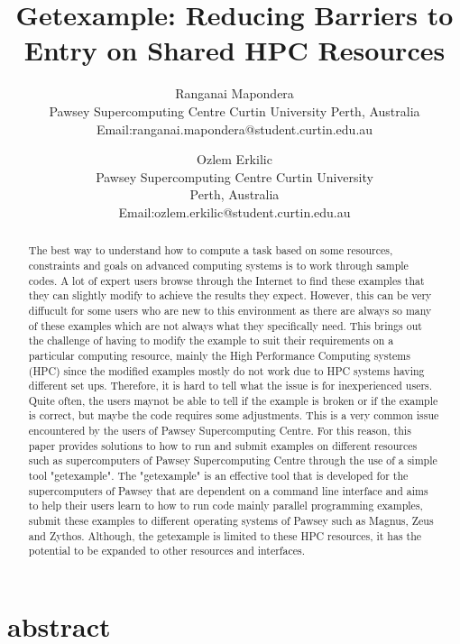 \documentclass[journal]{IEEEtran}
\begin{document}
\title{Getexample: Reducing Barriers to Entry on Shared HPC Resources}
\author{Ranganai Mapondera\\Pawsey Supercomputing Centre Curtin University Perth, Australia\\Email:ranganai.mapondera@student.curtin.edu.au}
\author{Ozlem Erkilic\\Pawsey Supercomputing Centre Curtin University\\Perth, Australia\\Email:ozlem.erkilic@student.curtin.edu.au}
\maketitle

\section{abstract}
\begin{abstract}

The best way to understand how to compute a task based on some resources, constraints and goals on advanced computing systems is to work through sample 
codes. A lot of expert users browse through the Internet to find these examples that they can slightly modify to achieve the results they expect. 
However, this can be very diffucult for some users who are new to this environment as there are always so many of these examples which are not 
always what they specifically need. This brings out the challenge of having to modify the example to suit their requirements on a particular computing 
resource, mainly the High Performance Computing systems (HPC) since the modified examples mostly do not work due to HPC systems having different set ups.
Therefore, it is hard to tell what the issue is for inexperienced users. Quite often, the users maynot be able to tell if the example is broken or if 
the example is correct, but maybe the code requires some adjustments. This is a very common issue encountered by the users of Pawsey Supercomputing 
Centre. For this reason, this paper provides solutions to how to run and submit examples on different resources such as supercomputers of Pawsey 
Supercomputing Centre through the use of a simple tool "getexample". The "getexample" is an effective tool that is developed for the supercomputers of 
Pawsey that are dependent on a command line interface and aims to help their users learn to how to run code mainly parallel programming examples, submit 
these examples to different operating systems of Pawsey such as Magnus, Zeus and Zythos. Although, the getexample is limited to these HPC resources, it 
has the potential to be expanded to other resources and interfaces. 

\end{abstract}
\end{document}
